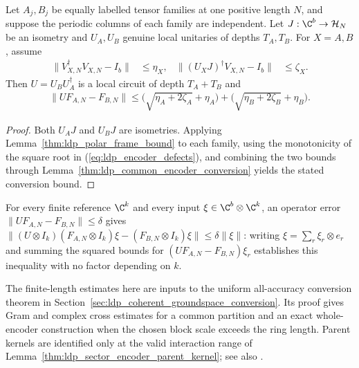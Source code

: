 \begin{lemma}
    \label{thm:ldp_canonical_encoder_conversion}
    \leanok
    Let $A_j,B_j$ be equally labelled tensor families at one positive
    length $N$, and suppose the periodic columns of each family are
    independent. Let $J:\C^b\to\mathcal H_N$ be an isometry and
    $U_A,U_B$ genuine local unitaries of depths $T_A,T_B$. For $X=A,B$,
    assume
    \begin{align}
        \|V_{X,N}^\dagger V_{X,N}-I_b\| & \le\eta_X,  &
        \|(U_XJ)^\dagger V_{X,N}-I_b\|  & \le\zeta_X.
        \label{eq:ldp_encoder_defects}
    \end{align}
    Then $U=U_BU_A^\dagger$ is a local circuit of depth $T_A+T_B$ and
    \begin{align}
        \|UF_{A,N}-F_{B,N}\|
        \le \bigl(\sqrt{\eta_A+2\zeta_A}+\eta_A\bigr)
        +\bigl(\sqrt{\eta_B+2\zeta_B}+\eta_B\bigr).
        \label{eq:ldp_encoder_conversion_bound}
    \end{align}
\end{lemma}
\begin{proof}\leanok
    Both $U_AJ$ and $U_BJ$ are isometries. Applying
    Lemma~\ref{thm:ldp_polar_frame_bound} to each family, using the
    monotonicity of the square root in (\ref{eq:ldp_encoder_defects}),
    and combining the two bounds through
    Lemma~\ref{thm:ldp_common_encoder_conversion} yields
    the stated conversion bound.
\end{proof}

For every finite reference $\C^k$ and every input
$\xi\in\C^b\otimes\C^k$, an operator error
$\|UF_{A,N}-F_{B,N}\|\le\delta$ gives
$\|(U\otimes I_k)(F_{A,N}\otimes I_k)\xi-(F_{B,N}\otimes I_k)\xi\|
    \le\delta\|\xi\|$: writing $\xi=\sum_r\xi_r\otimes e_r$
and summing the squared bounds for $(UF_{A,N}-F_{B,N})\xi_r$
establishes this inequality with no factor depending on $k$.

The finite-length estimates here are inputs to the uniform all-accuracy
conversion theorem in Section~\ref{sec:ldp_coherent_groundspace_conversion}.
Its proof gives Gram and complex cross estimates for a common partition
and an exact whole-encoder construction when the chosen block scale exceeds
the ring length. Parent kernels are identified only at the valid interaction
range of Lemma~\ref{thm:ldp_sector_encoder_parent_kernel}; see also
\cite{gap:mswc24_coherent_sector_encoder_scope}.
